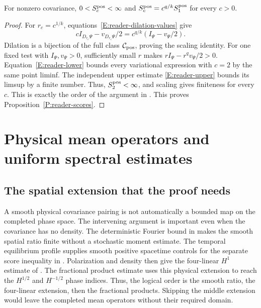 \begin{proposition}
  \label{P:reader-scores}
  For nonzero covariance, $0 < S^{\mathrm{pos}}_c < \infty$ and $S^{\mathrm{pos}}_c = c^{q/k}S^{\mathrm{pos}}_1$
  for every $c > 0$.
\end{proposition}
\begin{proof}
  For $r_c = c^{1/k}$, equations~\eqref{E:reader-dilation-values} give
  \[
    cI_{D_{r_c}\Psi}-v_{D_{r_c}\Psi}/2
    =c^{q/k}(I_\Psi-v_\Psi/2).
  \]
  Dilation is a bijection of the full class $\mathcal C_{\mathrm{pos}}$, proving the scaling
  identity. For one fixed test with $I_\Psi,v_\Psi > 0$, sufficiently small $r$
  makes $rI_\Psi-r^qv_\Psi/2 > 0$. Equation~\eqref{E:reader-lower} bounds every
  variational expression with $c = 2$ by the same point liminf. The independent
  upper estimate \eqref{E:reader-upper} bounds its limsup by a finite number.
  Thus, $S^{\mathrm{pos}}_2 < \infty$, and scaling gives finiteness for every $c$. This is
  exactly the order of the argument in
  . This proves
  Proposition~\ref{P:reader-scores}.
\end{proof}

\section{Physical mean operators and uniform spectral estimates}
\label{S:reader-means}
\subsection{The spatial extension that the proof needs}

A smooth physical covariance pairing is not automatically a bounded map on the
completed phase space. The intervening argument is important even when the
covariance has no density. The deterministic Fourier bound in
 makes the smooth spatial ratio finite
without a stochastic moment estimate. The temporal equilibrium profile supplies
smooth positive spacetime controls for the separate score inequality in
.
Polarization and density then give the four-linear $H^1$ estimate of
. The fractional product estimate
 uses this physical extension to
reach the $H^{1/2}$ and $H^{-1/2}$ phase indices. Thus, the logical order is the
smooth ratio, the four-linear extension, then the fractional products. Skipping
the middle extension would leave the completed mean operators without their
required domain.


